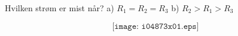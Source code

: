 

Hvilken strøm er mist når?
\vskip 10pt
a) $R_1=R_2=R_3$
\vskip 10pt
b) $R_2>R_1>R_3$
\vskip 10pt

$$\texttt{[image: i04873x01.eps]}$$




















